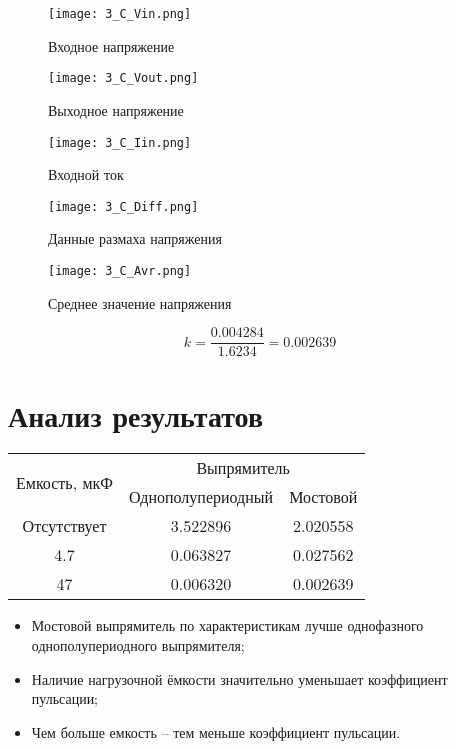 \documentclass[a4paper,14pt]{article}
\begin{document}
\begin{figure}[H]
	\centering
	\texttt{[image: 3\_C\_Vin.png]}
	\caption{Входное напряжение}	
\end{figure}

\begin{figure}[H]
	\centering
	\texttt{[image: 3\_C\_Vout.png]}
	\caption{Выходное напряжение}	
\end{figure}

\begin{figure}[H]
	\centering
	\texttt{[image: 3\_C\_Iin.png]}
	\caption{Входной ток}	
\end{figure}

\begin{figure}[H]
	\centering
	\texttt{[image: 3\_C\_Diff.png]}
	\caption{Данные размаха напряжения}	
\end{figure}

\begin{figure}[H]
	\centering
	\texttt{[image: 3\_C\_Avr.png]}
	\caption{Среднее значение напряжения}	
\end{figure}

$$k = \frac{0.004284}{1.6234} = 0.002639$$

\section{Анализ результатов}

\begin{table}[H]
	\begin{center}
	\begin{tabular}{|c|c|c|}
		\hline
		\multirow{2}{*}{Емкость, мкФ} & \multicolumn{2}{c|}{Выпрямитель} \\ \cline{2-3} 
		& Однополупериодный   & Мостовой   \\ \hline
		Отсутствует              & 3.522896            & 2.020558   \\ \hline
		4.7                      & 0.063827            & 0.027562   \\ \hline
		47                       & 0.006320            & 0.002639   \\ \hline
	\end{tabular}
	\end{center}
\end{table}

\begin{itemize}
	\item Мостовой выпрямитель по характеристикам лучше однофазного однополупериодного выпрямителя;
	\item Наличие нагрузочной ёмкости значительно уменьшает коэффициент пульсации;
	\item Чем больше емкость -- тем меньше коэффициент пульсации.
\end{itemize}
\end{document}
